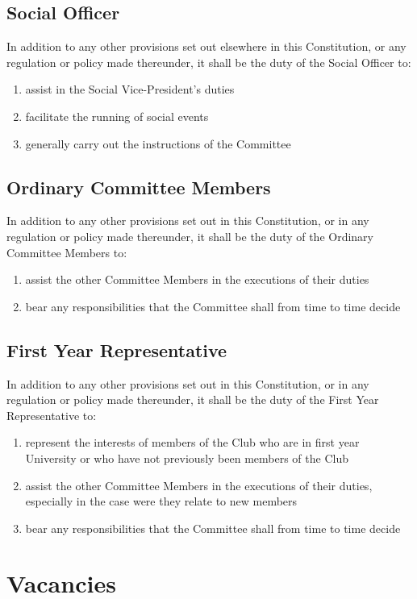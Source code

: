 \documentclass[11pt]{article} %
\begin{document}
\subsection{Social Officer}
In addition to any other provisions set out elsewhere in this Constitution, or any regulation or policy made thereunder, it shall be the duty of the Social Officer to:
\begin{enumerate}
	\item assist in the Social Vice-President's duties
	\item facilitate the running of social events
	\item generally carry out the instructions of the Committee
\end{enumerate}

\subsection{Ordinary Committee Members}
In addition to any other provisions set out in this Constitution, or in any regulation or policy made thereunder, it shall be the duty of the Ordinary Committee Members to:
\begin{enumerate}
	\item assist the other Committee Members in the executions of their duties
	\item bear any responsibilities that the Committee shall from time to time decide
\end{enumerate}

\subsection{First Year Representative}
In addition to any other provisions set out in this Constitution, or in any regulation or policy made thereunder, it shall be the duty of the First Year Representative to:
\begin{enumerate}
	\item represent the interests of members of the Club who are in first year University or who have not previously been members of the Club
	 \item assist the other Committee Members in the executions of their duties, especially in the case were they relate to new members
	\item bear any responsibilities that the Committee shall from time to time decide
\end{enumerate}

\section{Vacancies}
\end{document}
